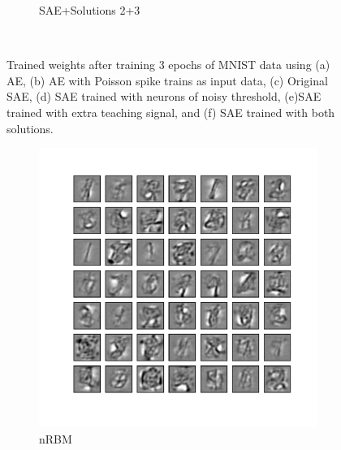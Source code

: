 \begin{figure}
\begin{subfigure}[t]{0.4\textwidth}
		\caption{SAE+Solutions 2+3}
	\end{subfigure}\\
	\caption{Trained weights after training 3 epochs of MNIST data using (a) AE, (b) AE with Poisson spike trains as input data, (c) Original SAE, (d)  SAE trained with neurons of noisy threshold, (e)SAE trained with extra teaching signal, and (f) SAE trained with both solutions.}
	\label{fig:weights_ae}
\end{figure}

\begin{figure}
	\centering
	\begin{subfigure}[t]{0.4\textwidth}
		\includegraphics[width=\textwidth]{pics_sdlm/32_MNIST_RBM/2_60000_0.pdf}
		\caption{nRBM}
	\end{subfigure}
	\begin{subfigure}[t]{0.4\textwidth}

\end{subfigure}
\end{figure}
